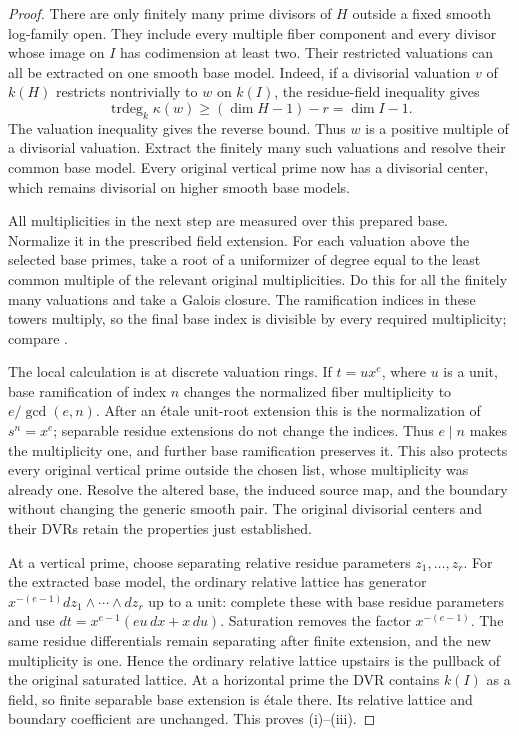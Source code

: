 \begin{proof}
There are only finitely many prime divisors of $H$ outside a fixed
smooth log-family open. They include every multiple fiber component
and every divisor whose image on $I$ has codimension at least two.
Their restricted valuations can all be extracted on one smooth base
model. Indeed, if a divisorial valuation $v$ of $k(H)$ restricts
nontrivially to $w$ on $k(I)$, the residue-field inequality gives
\[
 \operatorname{trdeg}_k\kappa(w)
 \geq (\dim H-1)-r=\dim I-1.
\]
The valuation inequality gives the reverse bound. Thus $w$ is a
positive multiple of a divisorial valuation. Extract the finitely many
such valuations and resolve their common base model. Every original
vertical prime now has a divisorial center, which remains divisorial
on higher smooth base models.

All multiplicities in the next step are measured over this prepared
base. Normalize it in the prescribed field extension. For
each valuation above the selected base primes, take a root of a
uniformizer of degree equal to the least common multiple of the
relevant original multiplicities. Do this for all the finitely many
valuations and take a Galois closure. The ramification indices in these
towers multiply, so the final base index is divisible by every required
multiplicity; compare \cite[Lemmas~9.10--9.11]{KovacsPatakfalvi}.

The local calculation is at discrete valuation rings. If $t=ux^e$,
where $u$ is a unit, base ramification of index $n$ changes the
normalized fiber multiplicity to $e/\gcd(e,n)$. After an \'{e}tale
unit-root extension this is the normalization of $s^n=x^e$; separable
residue extensions do not change the indices. Thus $e\mid n$ makes
the multiplicity one, and further base ramification preserves it.
This also protects every original vertical prime outside the chosen
list, whose multiplicity was already one. Resolve the altered base,
the induced source map, and the boundary without changing the generic
smooth pair. The original divisorial centers and their DVRs retain the
properties just established.

At a vertical prime, choose separating relative residue parameters
$z_1,\ldots,z_r$. For the extracted base model, the ordinary relative
lattice has generator
$x^{-(e-1)}dz_1\wedge\cdots\wedge dz_r$ up to a unit: complete these
with base residue parameters and use
$dt=x^{e-1}(eu\,dx+x\,du)$. Saturation removes the factor
$x^{-(e-1)}$. The same residue differentials remain separating after
finite extension, and the new multiplicity is one. Hence the ordinary
relative lattice upstairs is the pullback of the original saturated
lattice. At a horizontal prime the DVR contains $k(I)$ as a field,
so finite separable base extension is \'{e}tale there. Its relative
lattice and boundary coefficient are unchanged. This proves (i)--(iii).


\end{proof}
